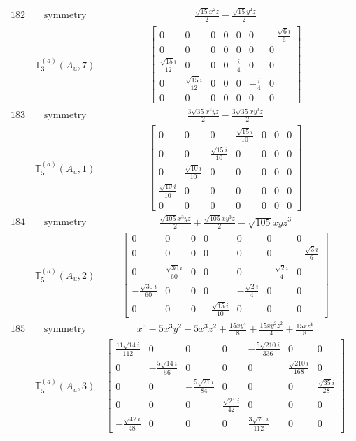 \documentclass[fleqn,8pt,landscape]{jsarticle}
\begin{document}
\begin{longtable}{ccc}
$ 182 $ & $ \text{symmetry} $ & $ \frac{\sqrt{15} x^{2} z}{2} - \frac{\sqrt{15} y^{2} z}{2} $ \\
$  $ & $ \mathbb{T}_{3}^{(a)}(A_{u},7) $ & $ \begin{bmatrix} 0 & 0 & 0 & 0 & 0 & 0 & - \frac{\sqrt{6} i}{6} \\ 0 & 0 & 0 & 0 & 0 & 0 & 0 \\ \frac{\sqrt{15} i}{12} & 0 & 0 & 0 & \frac{i}{4} & 0 & 0 \\ 0 & \frac{\sqrt{15} i}{12} & 0 & 0 & 0 & - \frac{i}{4} & 0 \\ 0 & 0 & 0 & 0 & 0 & 0 & 0 \end{bmatrix} $ \\ \hline
$ 183 $ & $ \text{symmetry} $ & $ \frac{3 \sqrt{35} x^{3} y z}{2} - \frac{3 \sqrt{35} x y^{3} z}{2} $ \\
$  $ & $ \mathbb{T}_{5}^{(a)}(A_{u},1) $ & $ \begin{bmatrix} 0 & 0 & 0 & \frac{\sqrt{15} i}{10} & 0 & 0 & 0 \\ 0 & 0 & \frac{\sqrt{15} i}{10} & 0 & 0 & 0 & 0 \\ 0 & \frac{\sqrt{10} i}{10} & 0 & 0 & 0 & 0 & 0 \\ \frac{\sqrt{10} i}{10} & 0 & 0 & 0 & 0 & 0 & 0 \\ 0 & 0 & 0 & 0 & 0 & 0 & 0 \end{bmatrix} $ \\ \hline
$ 184 $ & $ \text{symmetry} $ & $ \frac{\sqrt{105} x^{3} y z}{2} + \frac{\sqrt{105} x y^{3} z}{2} - \sqrt{105} x y z^{3} $ \\
$  $ & $ \mathbb{T}_{5}^{(a)}(A_{u},2) $ & $ \begin{bmatrix} 0 & 0 & 0 & 0 & 0 & 0 & 0 \\ 0 & 0 & 0 & 0 & 0 & 0 & - \frac{\sqrt{3} i}{6} \\ 0 & \frac{\sqrt{30} i}{60} & 0 & 0 & 0 & - \frac{\sqrt{2} i}{4} & 0 \\ - \frac{\sqrt{30} i}{60} & 0 & 0 & 0 & - \frac{\sqrt{2} i}{4} & 0 & 0 \\ 0 & 0 & 0 & - \frac{\sqrt{15} i}{10} & 0 & 0 & 0 \end{bmatrix} $ \\ \hline
$ 185 $ & $ \text{symmetry} $ & $ x^{5} - 5 x^{3} y^{2} - 5 x^{3} z^{2} + \frac{15 x y^{4}}{8} + \frac{15 x y^{2} z^{2}}{4} + \frac{15 x z^{4}}{8} $ \\
$  $ & $ \mathbb{T}_{5}^{(a)}(A_{u},3) $ & $ \begin{bmatrix} \frac{11 \sqrt{14} i}{112} & 0 & 0 & 0 & - \frac{5 \sqrt{210} i}{336} & 0 & 0 \\ 0 & - \frac{5 \sqrt{14} i}{56} & 0 & 0 & 0 & \frac{\sqrt{210} i}{168} & 0 \\ 0 & 0 & - \frac{5 \sqrt{21} i}{84} & 0 & 0 & 0 & \frac{\sqrt{35} i}{28} \\ 0 & 0 & 0 & \frac{\sqrt{21} i}{42} & 0 & 0 & 0 \\ - \frac{\sqrt{42} i}{48} & 0 & 0 & 0 & \frac{3 \sqrt{70} i}{112} & 0 & 0 \end{bmatrix} $ \\ \hline

\end{longtable}
\end{document}
